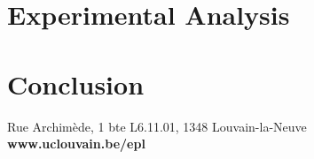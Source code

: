 \documentclass[a4paper,11pt, openright]{book}
\theoremstyle{definition}
\begin{document}
\chapter{Experimental Analysis}\label{analysis}


\chapter{Conclusion}\label{conclusion}






\nocite{*} %

\clearpage
\listoffigures

\clearpage
\listoftables


\appendix

%

\newpage
\thispagestyle{empty}   %

\vspace*{17.75cm}
\noindent \footnotesize \color{UCLblue}  \selectfont Rue Archim\`{e}de, 1 bte L6.11.01, 1348 Louvain-la-Neuve ~ ~ \color{EPLblue} \textbf{www.uclouvain.be/epl} \\
\vspace*{6pt}
\color{EPLblue}{\rule{18.5cm}{8.25cm}}
\end{document}
